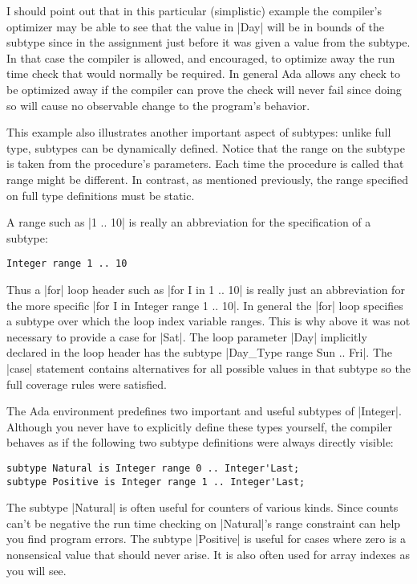I should point out that in this particular (simplistic) example the compiler's optimizer may be
able to see that the value in |Day| will be in bounds of the subtype since in the assignment
just before it was given a value from the subtype. In that case the compiler is allowed, and
encouraged, to optimize away the run time check that would normally be required. In general Ada
allows any check to be optimized away if the compiler can prove the check will never fail since
doing so will cause no observable change to the program's behavior.

This example also illustrates another important aspect of subtypes: unlike full type, subtypes
can be dynamically defined. Notice that the range on the subtype is taken from the procedure's
parameters. Each time the procedure is called that range might be different. In contrast, as
mentioned previously, the range specified on full type definitions must be static.

A range such as |1 .. 10| is really an abbreviation for the specification of a subtype:

\begin{lstlisting}
Integer range 1 .. 10
\end{lstlisting}

\noindent Thus a |for| loop header such as |for I in 1 .. 10| is really just an abbreviation for
the more specific |for I in Integer range 1 .. 10|. In general the |for| loop specifies a
subtype over which the loop index variable ranges. This is why above it was not necessary to
provide a case for |Sat|. The loop parameter |Day| implicitly declared in the loop header has
the subtype |Day_Type range Sun .. Fri|. The |case| statement contains alternatives for all
possible values in that subtype so the full coverage rules were satisfied.

The Ada environment predefines two important and useful subtypes of |Integer|. Although you
never have to explicitly define these types yourself, the compiler behaves as if the following
two subtype definitions were always directly visible:

\begin{lstlisting}
subtype Natural is Integer range 0 .. Integer'Last;
subtype Positive is Integer range 1 .. Integer'Last;
\end{lstlisting}

\noindent The subtype |Natural| is often useful for counters of various kinds. Since counts
can't be negative the run time checking on |Natural|'s range constraint can help you find
program errors. The subtype |Positive| is useful for cases where zero is a nonsensical value
that should never arise. It is also often used for array indexes as you will see.

